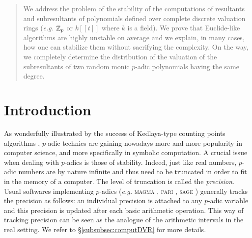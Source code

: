 \documentclass{article}
\begin{document}
\begin{abstract}
We address the problem of the stability of the computations of resultants 
and subresultants of polynomials defined over complete discrete valuation 
rings (\emph{e.g.} $\mathbb Z_p$ or $k[[t]]$ where $k$ is a field). We prove that 
Euclide-like algorithms are highly unstable on average and we explain, in
many cases, how one can stabilize them without sacrifying the complexity.
On the way, we completely determine the distribution of the valuation of
the subresultants of two random monic $p$-adic polynomials having the
same degree.
\end{abstract}

\section{Introduction}

As wonderfully illustrated by the success of Kedlaya-type counting 
points algorithms \cite{kedlaya}, $p$-adic technics are gaining nowadays 
more and more popularity in computer science, and more specifically in 
symbolic computation. A crucial issue when dealing with $p$-adics is 
those of stability. Indeed, just like real numbers, $p$-adic numbers are 
by nature infinite and thus need to be truncated in order to fit in the 
memory of a computer. The level of truncation is called the 
\emph{precision}. Usual softwares implementing $p$-adics (\emph{e.g.} 
\textsc{magma} \cite{magma}, \textsc{pari} \cite{pari}, \textsc{sage} 
\cite{sage}) generally tracks the precision as follows: an individual 
precision is attached to any $p$-adic variable and this precision is 
updated after each basic arithmetic operation. This way of tracking 
precision can be seen as the analogue of the arithmetic intervals in the 
real setting. We refer to \S \ref{subsubsec:computDVR} for more details.
\end{document}
